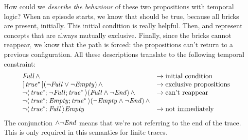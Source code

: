 How could we \emph{describe the behaviour} of these two propositions with
temporal logic? When an episode starts, we know that  should be
true, because all bricks are present, initially. This initial condition is
really helpful. Then,  and  represent concepts that
are always mutually exclusive. Finally, since the bricks cannot reappear, we
know that the path is forced: the propositions can't return to a previous
configuration. All these descriptions translate to the following \ldl{}
temporal constraint:
\begin{equation}
	\begin{array}{ll}
		\const{Full}\, \land &
		\to \text{initial condition}\\
		\lbox{\true^*} (\lnot \const{Full} \lor \lnot \const{Empty})\, \land &
		\to \text{exclusive propositions}\\
		\lnot \ldiamond{\true^*; \lnot \const{Full}; \true^*}
		(\const{Full} \land \lnot \lend)\, \land &
		\to \text{can't reappear}\\
		\lnot \ldiamond{\true^*; \const{Empty}; \true^*}
		(\lnot \const{Empty} \land \lnot \lend)\, \land \\
		\lnot \ldiamond{\true^*; \const{Full}} \const{Empty} &
		\to \text{not immediately}\\
	\end{array}
	\label{eq:breakout-constraint}
\end{equation}
The conjunction $\land \neg \text{\textit{End}}$ means that we're not referring to the end
of the trace. This is only required in this \ldl{} semantics for finite
traces.

